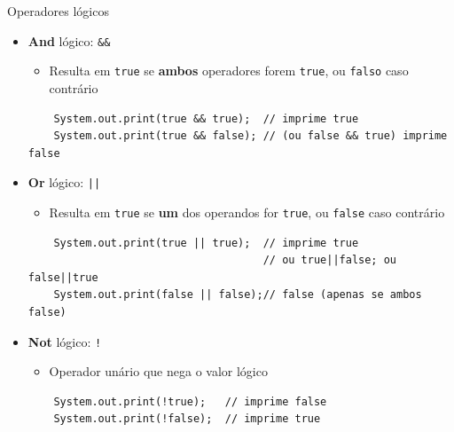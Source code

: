 \documentclass[portuguese, aspectratio=169, xcolor=table]{beamer}
\begin{document}
\begin{frame}[fragile]{Operadores lógicos}
\begin{itemize}
    \item \textbf{And} lógico: \texttt{&&}
    \begin{itemize}
        \item Resulta em \texttt{true} se \textbf{ambos} operadores forem \texttt{true}, ou \texttt{falso} caso contrário
    \end{itemize}
    \begin{verbatim}
    System.out.print(true && true);  // imprime true
    System.out.print(true && false); // (ou false && true) imprime false
    \end{verbatim}
    \item \textbf{Or} lógico: \texttt{||}
    \begin{itemize}
        \item Resulta em \texttt{true} se \textbf{um} dos operandos for \texttt{true}, ou \texttt{false} caso contrário
    \end{itemize}
    \begin{verbatim}
    System.out.print(true || true);  // imprime true
                                     // ou true||false; ou false||true
    System.out.print(false || false);// false (apenas se ambos false)
    \end{verbatim}
    \item \textbf{Not} lógico: \texttt{!}
    \begin{itemize}
        \item Operador unário que nega o valor lógico
    \end{itemize}
    \begin{verbatim}
    System.out.print(!true);   // imprime false
    System.out.print(!false);  // imprime true
    \end{verbatim}
    \end{itemize}
\end{frame}
\end{document}

